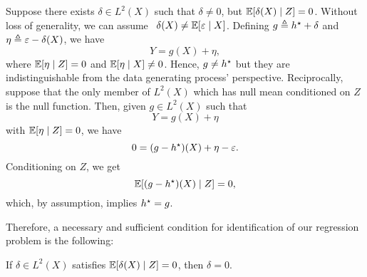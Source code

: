 Suppose there exists $ \delta \in L^{ 2 } ( X ) $ such that $ \delta \neq 0 $, but $ \mathbb{E} [ \delta ( X ) \mid Z ] = 0 $.
Without loss of generality, we can assume\footnotemark~ $ \delta ( X ) \neq \mathbb{E} [ \varepsilon \mid X ] $.
Defining $ g \triangleq h^{ \star } + \delta $ and $ \eta \triangleq \varepsilon - \delta ( X ) $, we have
\begin{equation*}
    Y = g ( X ) + \eta
,\end{equation*}
where $ \mathbb{E} [ \eta \mid Z ] = 0 $ and $ \mathbb{E} [ \eta \mid X ] \neq 0 $.
Hence, $ g \neq h^{ \star } $ but they are indistinguishable from the data generating process' perspective.
Reciprocally, suppose that the only member of $ L^{ 2 } ( X ) $ which has null mean conditioned on $ Z $ is the null function.
Then, given $ g \in L^{ 2 } ( X ) $ such that
\begin{equation*}
    Y = g ( X ) + \eta
\end{equation*}
with $ \mathbb{E} [ \eta \mid Z ] = 0 $, we have
\begin{equation*}
    0 = ( g - h^{ \star } ) ( X ) + \eta - \varepsilon
.\end{equation*}
Conditioning on $ Z $, we get
\begin{equation*}
    \mathbb{E} [ ( g - h^{ \star } ) ( X ) \mid Z ] = 0
,\end{equation*}
which, by assumption, implies $ h^{ \star } = g $.

Therefore, a necessary and sufficient condition for identification of our regression problem is the following:
\begin{assump*}[Identification]
    If $ \delta \in L^{ 2 } ( X ) $ satisfies $ \mathbb{E} [ \delta ( X ) \mid Z ] = 0 $, then $ \delta = 0 $.
\end{assump*}

